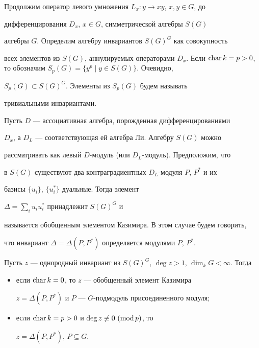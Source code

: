  


Продолжим оператор левого умножения $L_x:y\to xy$, $x,y\in G$, до 


дифференцирования $D_x$, $x\in G$, симметрической алгебры $S(G)$ 


алгебры $G$. Определим алгебру инвариантов $S(G)^G$ как совокупность 


всех элементов из $S(G)$, аннулируемых операторами $D_x$. Если $\Char 


k=p>0$, то обозначим $S_p(G)=\{y^p\mid y\in S(G)\}$. Очевидно, 


$S_p(G)\subset S(G)^G$. Элементы из $S_p(G)$ будем называть 


тривиальными инвариантами. 


 


Пусть $D$ --- ассоциативная алгебра, порожденная дифференцированиями 


$D_x$, а $D_L$ --- соответствующая ей алгебра Ли. Алгебру $S(G)$ можно 


рассматривать как левый $D$-модуль (или $D_L$-модуль). Предположим, что 


в $S(G)$ существуют два контраградиентных $D_L$-модуля $P$, $P^*$ и их 


базисы $\{u_i\}$, $\{u_i^*\}$ дуальные. Тогда элемент 


$\Delta=\sum\limits_i u_i u_i^*$ принадлежит $S(G)^G$ и


называeтся обобщенным элементом Казимира. В этом случае будем говорить, 


что инвариант $\Delta=\Delta(P,P^*)$ определяется модулями $P$, $P^*$. 


 


\begin{thmnonum} 


Пусть $z$ --- однородный инвариант из $S(G)^G$, $\deg z>1$, $\dim_k 


G<\infty$. Тогда 


\begin{itemize} 


\item[1)] если $\operatorname{char} k=0$, то $z$ --- обобщенный элемент Казимира 


$z=\Delta(P,P^*)$ и $P$ --- $G$-подмодуль присоединенного модуля$;$ 


\item[2)] если $\operatorname{char} k=p>0$ и $\deg z\not\equiv0\ (\operatorname{mod} p)$, то 


$z=\Delta(P,P^*)$, $P\subseteq G$. 


\end{itemize} 


\end{thmnonum} 


